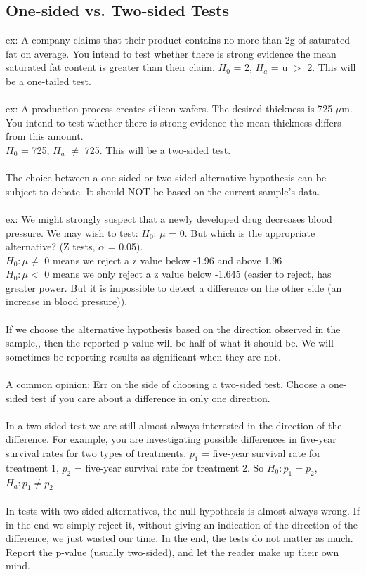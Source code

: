 \documentclass[12pt, a4paper]{article}
\begin{document}
	\subsection{One-sided vs. Two-sided Tests}
	ex: A company claims that their product contains no more than 2g of saturated fat on average. You intend to test whether there is strong evidence the mean saturated fat content is greater than their claim. $H_0$ = 2, $H_a$ = u $>$ 2. This will be a one-tailed test.\\~\\
	ex: A production process creates silicon wafers. The desired thickness is 725 $\mu$m. You intend to test whether there is strong evidence the mean thickness differs from this amount. \\ $H_0$ = 725, $H_a$ $\neq$ 725. This will be a two-sided test. \\~\\
	The choice between a one-sided or two-sided alternative hypothesis can be subject to debate. It should NOT be based on the current sample's data. \\~\\
	ex: We might strongly suspect that a newly developed drug decreases blood pressure. We may wish to test: $H_0$: $\mu$ = 0. But which is the appropriate alternative? (Z tests, $\alpha$ = 0.05). \\
	$H_0: \mu \neq$ 0 means we reject a z value below -1.96 and above 1.96 \\
	$H_0: \mu <$ 0 means we only reject a z value below -1.645 (easier to reject, has greater power. But it is impossible to detect a difference on the other side (an increase in blood pressure)).\\~\\
	If we choose the alternative hypothesis based on the direction observed in the sample,, then the reported p-value will be half of what it should be. We will sometimes be reporting results as significant when they are not. \\~\\
	A common opinion: Err on the side of choosing a two-sided test. Choose a one-sided test if you care about a difference in only one direction. \\~\\
	In a two-sided test we are still almost always interested in the direction of the difference. For example, you are investigating possible differences in five-year survival rates for two types of treatments. $p_1$ = five-year survival rate for treatment 1, $p_2$ = five-year survival rate for treatment 2. So $H_0: p_1 = p_2$, $H_a: p_1 \neq p_2$ \\~\\
	In tests with two-sided alternatives, the null hypothesis is almost always wrong. If in the end we simply reject it, without giving an indication of the direction of the difference, we just wasted our time. In the end, the tests do not matter as much. Report the p-value (usually two-sided), and let the reader make up their own mind. \\~\\
	
\end{document}
